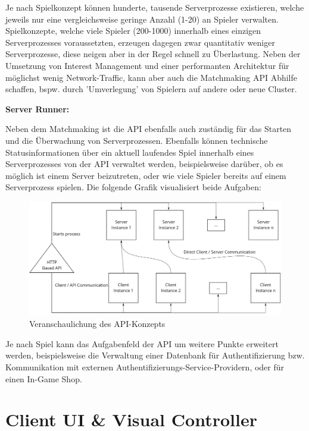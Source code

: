 Je nach Spielkonzept können hunderte, tausende Serverprozesse existieren, welche jeweils nur eine vergleichsweise geringe Anzahl (1-20) an Spieler verwalten. Spielkonzepte, welche viele Spieler (200-1000) innerhalb eines einzigen Serverprozesses voraussetzten, erzeugen dagegen zwar quantitativ weniger Serverprozesse, diese neigen aber in der Regel schnell zu Überlastung. Neben der Umsetzung von Interest Management und einer performanten Architektur für möglichst wenig Network-Traffic, kann aber auch die Matchmaking API Abhilfe schaffen, bspw. durch 'Umverlegung' von Spielern auf andere oder neue Cluster.

\textbf{Server Runner:}

Neben dem Matchmaking ist die API ebenfalls auch zuständig für das Starten und die Überwachung von Serverprozessen.
Ebenfalls können technische Statusinformationen über ein aktuell laufendes Spiel innerhalb eines Serverprozesses von der API verwaltet werden, beispielsweise darüber, ob es möglich ist einem Server beizutreten, oder wie viele Spieler bereits auf einem Serverprozess spielen. Die folgende Grafik visualisiert beide Aufgaben:

\begin{figure}[H]
	\centering
	\includegraphics[width=120mm]{images/API_Konzept_Diagramm.jpg}
	\caption[API Konzept Diagramm]{Veranschaulichung des API-Konzepts}
	\label{pic:API_Konzept_Diagramm}
\end{figure}

Je nach Spiel kann das Aufgabenfeld der API um weitere Punkte erweitert werden, beispielsweise die Verwaltung einer Datenbank für Authentifizierung bzw. Kommunikation mit externen Authentifizierungs-Service-Providern, oder für einen In-Game Shop.

\section{Client UI \& Visual Controller}

